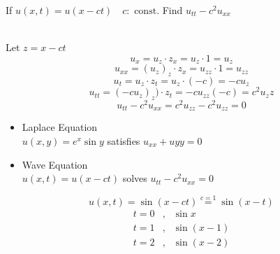 \begin{eg}
If \(u(x, t) = u(x - ct) \quad c:\text{ const}\). Find \(u_{tt} - c^2u_{xx}\)

\soln \ \\
Let \(z = x - ct\)
\[u_x = u_z \cdot z_x = u_z \cdot 1 = u_z\]
\[u_{xx} = (u_z)_z \cdot  z_x = u_{zz} \cdot 1 = u_{zz}\]
\[u_t = u_z \cdot z_t = u_z \cdot (-c) = -cu_z\]
\[u_{tt} = (-cu_z)_z) \cdot z_t = -c u_{zz}(-c) = c^2 {u_zz}\]
\[u_{tt} - c^2u_{xx} = c^2 u_{zz} - c^2u_{zz} = 0\]
\end{eg}
\begin{notn}
\begin{itemize}
\item Laplace Equation\\
\(u(x, y) = e^x \sin y \) satisfies \(u_{xx} + u{yy} = 0\)
\item Wave Equation\\
\(u(x, t) = u(x - ct)\) solves \(u_{tt} - c^2u_{xx} = 0\)
\end{itemize}
\end{notn}
\begin{eg}
\[u(x, t) = \sin (x - ct) \overset{c = 1}{=} \sin (x - t)\]
\[\begin{array}{rcl}
t = 0 &, & \sin x\\
t = 1 &, & \sin (x - 1)\\
t = 2 &, & \sin (x - 2)
\end{array}\]
\end{eg}
